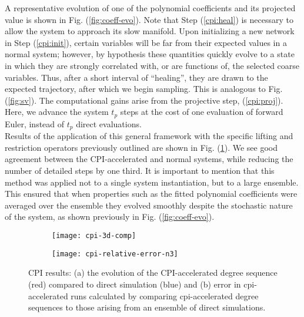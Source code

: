 \documentclass[epjST, final]{svjour}
\begin{document}
\begin{onehalfspace}
A representative evolution of one of the polynomial coefficients and its projected value is shown in Fig. (\ref{fig:coeff-evo}). Note that Step (\ref{cpi:heal}) is necessary to allow the system to approach its slow manifold. Upon initializing a new network in Step (\ref{cpi:init}), certain variables will be far from their expected values in a normal system; however, by hypothesis these quantities quickly evolve to a state in which they are strongly correlated with, or are functions of, the selected coarse variables. Thus, after a short interval of ``healing'', they are drawn to the expected trajectory, after which we begin sampling. This is analogous to Fig. (\ref{fig:sv}). The computational gains arise from the projective step, (\ref{cpi:proj}). Here, we advance the system $t_p$ steps at the cost of one evaluation of forward Euler, instead of $t_p$ direct evaluations. \\

Results of the application of this general framework with the specific lifting and restriction operators previously outlined are shown in Fig. (\ref{fig:cpi-results}). We see good agreement between the CPI-accelerated and normal systems, while reducing the number of detailed steps by one third. It is important to mention that this method was applied not to a single system instantiation, but to a large ensemble. This ensured that when properties such as the fitted polynomial coefficients were averaged over the ensemble they evolved smoothly despite the stochastic nature of the system, as shown previously in Fig. (\ref{fig:coeff-evo}).

\begin{figure}[h!]
  \vspace{-5mm}
  \centering
  \begin{subfigure}{0.49\textwidth}
    \centering
    \texttt{[image: cpi-3d-comp]}
    \subcaption{\label{fig:cpi-error}}
  \end{subfigure} %
  \begin{subfigure}{0.49\textwidth}
    \centering
    \texttt{[image: cpi-relative-error-n3]}
    \subcaption{\label{fig:self-error}}
  \end{subfigure}%
  \caption{CPI results: (a) the evolution of the CPI-accelerated
    degree sequence (red) compared to direct simulation (blue) and (b)
    error in cpi-accelerated runs calculated by comparing
    cpi-accelerated degree sequences to those arising from an ensemble
    of direct simulations. \label{fig:cpi-results}}
\end{figure}



\end{onehalfspace}
\end{document}

